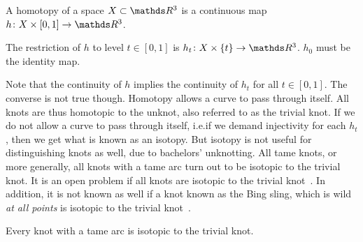 \begin{defn}[Homotopy]
    A homotopy of a space \(X \subset \rthree\) is a continuous map \(h \colon X \times [0, 1] \rightarrow \rthree\).

    The restriction of \(h\) to level \(t \in [0, 1]\) is \(h_t \colon X \times \{t\} \rightarrow \rthree\). \(h_0\) must be the identity map.
\end{defn}
Note that the continuity of \(h\) implies the continuity of \(h_t\) for all \(t \in [0,1]\). The converse is not true though. Homotopy allows a curve to pass through itself. All knots are thus homotopic to the unknot, also referred to as the trivial knot. If we do not allow a curve to pass through itself, i.e.\@ if we demand injectivity for each \(h_t\), then we get what is known as an isotopy. But isotopy is not useful for distinguishing knots as well, due to bachelors' unknotting. All tame knots, or more generally, all knots with a tame arc turn out to be isotopic to the trivial knot. It is an open problem if all knots are isotopic to the trivial knot~\cite{ancel, shijie}. In addition, it is not known as well if a knot known as the Bing sling, which is wild \textit{at all points} is isotopic to the trivial knot~\cite{ancel, shijie}.
\begin{prop}
    Every knot with a tame arc is isotopic to the trivial knot.
\end{prop}
